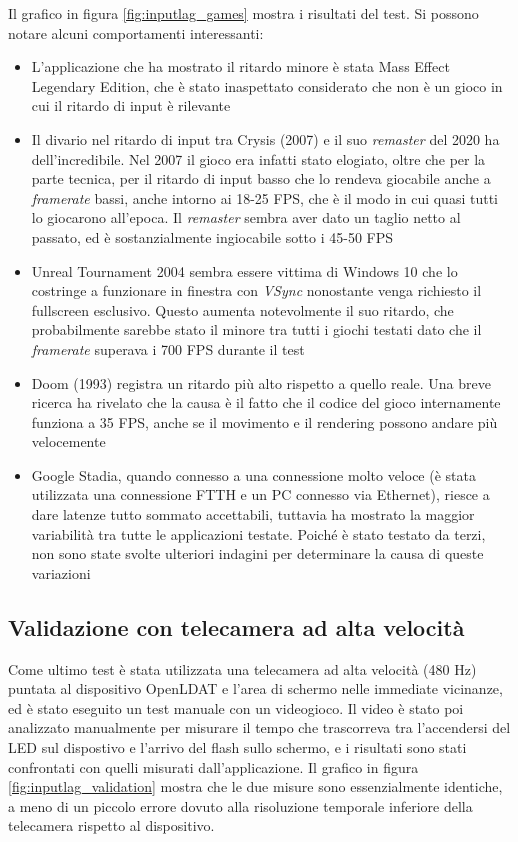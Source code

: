 Il grafico in figura \ref{fig:inputlag_games} mostra i risultati del test. Si possono notare alcuni comportamenti interessanti: \begin{itemize}
	\item L'applicazione che ha mostrato il ritardo minore è stata Mass Effect Legendary Edition, che è stato inaspettato considerato che non è un gioco in cui il ritardo di input è rilevante
	\item Il divario nel ritardo di input tra Crysis (2007) e il suo \textit{remaster} del 2020 ha dell'incredibile. Nel 2007 il gioco era infatti stato elogiato, oltre che per la parte tecnica, per il ritardo di input basso che lo rendeva giocabile anche a \textit{framerate} bassi, anche intorno ai 18-25 FPS, che è il modo in cui quasi tutti lo giocarono all'epoca. Il \textit{remaster} sembra aver dato un taglio netto al passato, ed è sostanzialmente ingiocabile sotto i 45-50 FPS
	\item Unreal Tournament 2004 sembra essere vittima di Windows 10 che lo costringe a funzionare in finestra con \textit{VSync} nonostante venga richiesto il fullscreen esclusivo. Questo aumenta notevolmente il suo ritardo, che probabilmente sarebbe stato il minore tra tutti i giochi testati dato che il \textit{framerate} superava i 700 FPS durante il test
	\item Doom (1993) registra un ritardo più alto rispetto a quello reale. Una breve ricerca ha rivelato che la causa è il fatto che il codice del gioco internamente funziona a 35 FPS, anche se il movimento e il rendering possono andare più velocemente
	\item Google Stadia, quando connesso a una connessione molto veloce (è stata utilizzata una connessione FTTH e un PC connesso via Ethernet), riesce a dare latenze tutto sommato accettabili, tuttavia ha mostrato la maggior variabilità tra tutte le applicazioni testate. Poiché è stato testato da terzi, non sono state svolte ulteriori indagini per determinare la causa di queste variazioni
\end{itemize}

\subsection{Validazione con telecamera ad alta velocità}
Come ultimo test è stata utilizzata una telecamera ad alta velocità (480 Hz) puntata al dispositivo OpenLDAT e l'area di schermo nelle immediate vicinanze, ed è stato eseguito un test manuale con un videogioco. Il video è stato poi analizzato manualmente per misurare il tempo che trascorreva tra l'accendersi del LED sul dispostivo e l'arrivo del flash sullo schermo, e i risultati sono stati confrontati con quelli misurati dall'applicazione. Il grafico in figura \ref{fig:inputlag_validation} mostra che le due misure sono essenzialmente identiche, a meno di un piccolo errore dovuto alla risoluzione temporale inferiore della telecamera rispetto al dispositivo.


